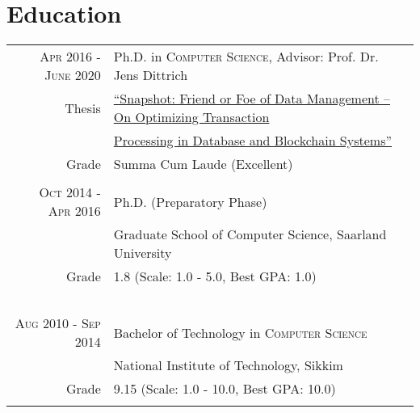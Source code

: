 \documentclass[a4paper,10pt]{article} %
\begin{document}
\section{Education}
\vspace*{0.2cm}
\begin{tabular}{rp{13cm}}	
	\textsc{Apr 2016 - June 2020} & Ph.D. in \textsc{Computer Science}, Advisor: Prof. Dr. Jens Dittrich\\
	Thesis& \href{https://publikationen.sulb.uni-saarland.de/handle/20.500.11880/29329}{``Snapshot: Friend or Foe of Data Management -- On Optimizing Transaction}\\
	&\href{https://publikationen.sulb.uni-saarland.de/handle/20.500.11880/29329}{Processing in Database and Blockchain Systems''}\\
	Grade&Summa Cum Laude (Excellent)\\
	&\\
	
	
	\textsc{Oct 2014 - Apr 2016} & Ph.D. (Preparatory Phase)\\
	& Graduate School of Computer Science, Saarland University\\
	Grade&1.8 (Scale: 1.0 - 5.0, Best GPA: 1.0)\\\
	&\\
	
%	
	
	
	
	\textsc{Aug 2010 - Sep 2014} & Bachelor of Technology in \textsc{Computer Science}\\
	& National Institute of Technology, Sikkim\\
	Grade& 9.15 (Scale: 1.0 - 10.0, Best GPA: 10.0)\\
	&\\
	
\end{tabular}
\end{document}
